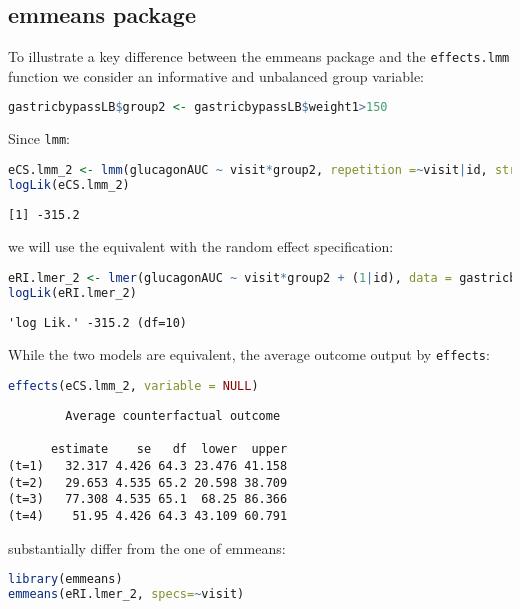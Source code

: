 \documentclass[12pt]{article}
\begin{document}
\subsection{emmeans package}
\label{sec:org40bd691}

To illustrate a key difference between the emmeans package and the
\texttt{effects.lmm} function we consider an informative and unbalanced group
variable:
\begin{lstlisting}[language=r,numbers=none]
gastricbypassLB$group2 <- gastricbypassLB$weight1>150
\end{lstlisting}

Since \texttt{lmm}:
\begin{lstlisting}[language=r,numbers=none]
eCS.lmm_2 <- lmm(glucagonAUC ~ visit*group2, repetition =~visit|id, structure = "CS", data = gastricbypassLB)
logLik(eCS.lmm_2)
\end{lstlisting}

\label{}
\begin{verbatim}
[1] -315.2
\end{verbatim}


we will use the equivalent with the random effect specification:

\begin{lstlisting}[language=r,numbers=none]
eRI.lmer_2 <- lmer(glucagonAUC ~ visit*group2 + (1|id), data = gastricbypassLB)
logLik(eRI.lmer_2)
\end{lstlisting}

\label{}
\begin{verbatim}
'log Lik.' -315.2 (df=10)
\end{verbatim}


While the two models are equivalent, the average outcome output by
\texttt{effects}:
\begin{lstlisting}[language=r,numbers=none]
effects(eCS.lmm_2, variable = NULL)
\end{lstlisting}

\label{}
\begin{verbatim}
		Average counterfactual outcome

      estimate    se   df  lower  upper
(t=1)   32.317 4.426 64.3 23.476 41.158
(t=2)   29.653 4.535 65.2 20.598 38.709
(t=3)   77.308 4.535 65.1  68.25 86.366
(t=4)    51.95 4.426 64.3 43.109 60.791
\end{verbatim}


substantially differ from the one of emmeans:
\begin{lstlisting}[language=r,numbers=none]
library(emmeans)
emmeans(eRI.lmer_2, specs=~visit)
\end{lstlisting}
\end{document}
